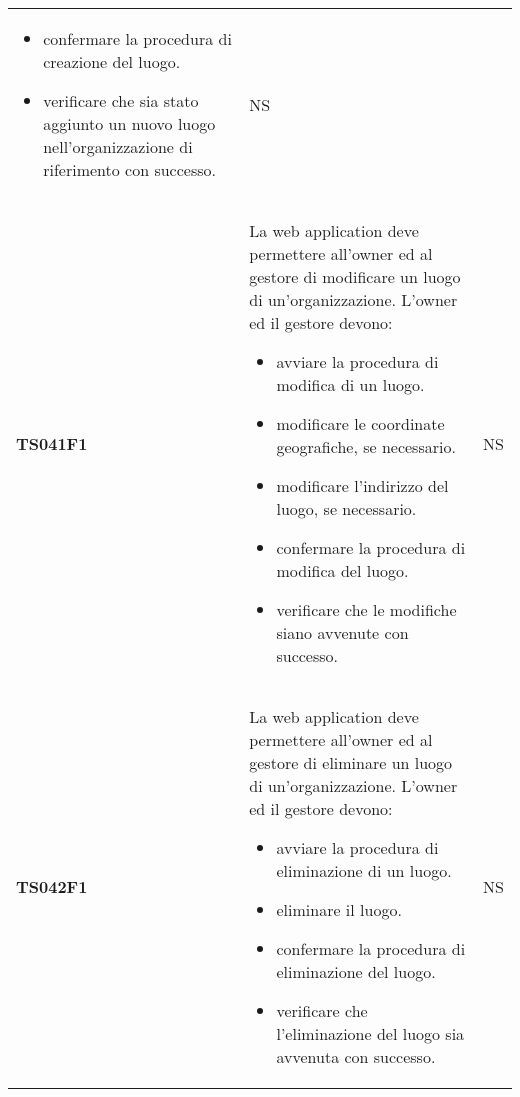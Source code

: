 \documentclass[../piano-di-qualifica.tex]{subfiles}
\begin{document}
\begin{centering}
\begin{longtable}[H]{>{\centering\bfseries}m{3cm} >{}p{10cm} >{\centering\arraybackslash}m{3cm}}
\begin{itemize}
      \item confermare la procedura di creazione del luogo.
      \item verificare che sia stato aggiunto un nuovo luogo nell'organizzazione di riferimento con successo.
    \end{itemize}
                       & NS                                                                                                                                                                                                                                                               \\
    TS041F1            & La web application deve permettere all'owner ed al gestore di modificare un luogo di un'organizzazione. \newline
    L'owner ed il gestore devono:
    \begin{itemize}
      \item avviare la procedura di modifica di un luogo.
      \item modificare le coordinate geografiche, se necessario.
      \item modificare l'indirizzo del luogo, se necessario.
      \item confermare la procedura di modifica del luogo.
      \item verificare che le modifiche siano avvenute con successo.
    \end{itemize}
                       & NS                                                                                                                                                                                                                                                               \\
    TS042F1            & La web application deve permettere all'owner ed al gestore di eliminare un luogo di un'organizzazione. \newline
    L'owner ed il gestore devono:
    \begin{itemize}
      \item avviare la procedura di eliminazione di un luogo.
      \item eliminare il luogo.
      \item confermare la procedura di eliminazione del luogo.
      \item verificare che l'eliminazione del luogo sia avvenuta con successo.
    \end{itemize}
                       & NS                                                                                                                                                                                                                                                               \\

\end{longtable}
\end{centering}
\end{document}
